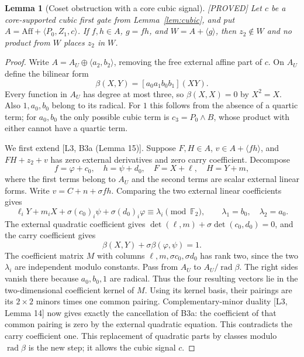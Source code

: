 \documentclass[11pt,a4paper]{article}
\newtheorem{lemma}[theorem]{Lemma}
\newcommand{\Aff}{\mathrm{Aff}}
\newcommand{\status}[1]{\hfill\textsf{[#1]}}
\begin{document}
\begin{lemma}[Coset obstruction with a core cubic signal]\label{lem:corecoset}\status{PROVED}
Let $c$ be a core-supported cubic first gate from Lemma~\ref{lem:cubic}, and put $A=\Aff+\langle P_0,Z_1,c\rangle$. If $f,h\in A$, $g=fh$, and $W=A+\langle g\rangle$, then $z_2\notin W$ and no product from $W$ places $z_2$ in $W$.
\end{lemma}
\begin{proof}
Write $A=A_U\oplus\langle a_2,b_2\rangle$, removing the free external affine part of $c$. On $A_U$ define the bilinear form
\[
\beta(X,Y)=[a_0a_1b_0b_1](XY).
\]
Every function in $A_U$ has degree at most three, so $\beta(X,X)=0$ by $X^2=X$. Also $1,a_0,b_0$ belong to its radical. For $1$ this follows from the absence of a quartic term; for $a_0,b_0$ the only possible cubic term is $c_3=P_0\wedge B$, whose product with either cannot have a quartic term.

We first extend [L3, B3a (Lemma 15)]. Suppose $F,H\in A$, $v\in A+\langle fh\rangle$, and $FH+z_2+v$ has zero external derivatives and zero carry coefficient. Decompose
\[
f=\varphi+c_0,\quad h=\psi+d_0,\quad F=X+\ell,\quad H=Y+m,
\]
where the first terms belong to $A_U$ and the second terms are scalar external linear forms. Write $v=C+n+\sigma fh$. Comparing the two external linear coefficients gives
\[
\ell_iY+m_iX+\sigma(c_0)_i\psi+\sigma(d_0)_i\varphi
\equiv\lambda_i\pmod{\mathbb F_2},\qquad
\lambda_1=b_0,\quad\lambda_2=a_0.
\]
The external quadratic coefficient gives $\det(\ell,m)+\sigma\det(c_0,d_0)=0$, and the carry coefficient gives
\[
\beta(X,Y)+\sigma\beta(\varphi,\psi)=1.
\]
The coefficient matrix $M$ with columns $\ell,m,\sigma c_0,\sigma d_0$ has rank two, since the two $\lambda_i$ are independent modulo constants. Pass from $A_U$ to $A_U/\operatorname{rad}\beta$. The right sides vanish there because $a_0,b_0,1$ are radical. Thus the four resulting vectors lie in the two-dimensional coefficient kernel of $M$. Using its kernel basis, their pairings are its $2\times2$ minors times one common pairing. Complementary-minor duality [L3, Lemma 14] now gives exactly the cancellation of B3a: the coefficient of that common pairing is zero by the external quadratic equation. This contradicts the carry coefficient one. This replacement of quadratic parts by classes modulo $\operatorname{rad}\beta$ is the new step; it allows the cubic signal $c$.


\end{proof}
\end{document}
